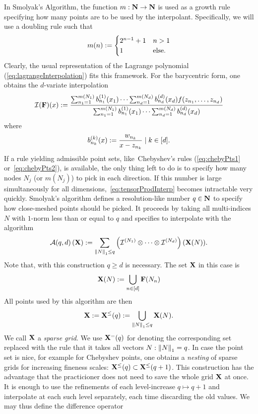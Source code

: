 \documentclass[12pt, oneside]{amsart}
\theoremstyle{definition}
\theoremstyle{remark}
\numberwithin{equation}{section}
\begin{document}
In Smolyak's Algorithm, the function \(m: \N \to \N\) is used as a growth rule specifying how many points are to be used by the interpolant. Specifically, we will use a doubling rule such that \[
    m(n) \defn \begin{cases}
        2^{n-1}+1 &n > 1\\
        1 &\text{else}.
    \end{cases}
\]
Clearly, the usual representation of the Lagrange polynomial (\ref{eq:lagrangeInterpolation}) fits this framework. For the barycentric form, one obtains the \(d\)-variate interpolation
\begin{equation}\label{eq:multivarBarycentric}
    \cI(\FF)(x) \defn \frac{\sum_{n_1=1}^{m(N_1)} b^{(1)}_{n_1}(x_1) \cdots \sum_{n_d=1}^{m(N_d)}b^{(d)}_{n_d}(x_d) f(z_{n_1}, \dots, z_{n_d})}{\sum_{n_1=1}^{m(N_1)} b^{(1)}_{n_1}(x_1) \cdots \sum_{n_d=1}^{m(N_d)}b^{(d)}_{n_d}(x_d)}
\end{equation}
where
\begin{equation}\label{eq:barycentricBasis}
    b^{(k)}_{n_k}(x) \defn \frac{w_{n_k}}{x-z_{n_k}} \mid k \in [d].
\end{equation}
If a rule yielding admissible point sets, like\ Chebyshev's rules (\ref{eq:chebyPts1} or\ \ref{eq:chebyPts2}), is available, the only thing left to do is to specify how many nodes \(N_j\) (or \(m(N_j)\)) to pick in each direction. If this number is large simultaneously for all dimensions,\ \cref{eq:tensorProdInterp} becomes intractable very quickly. Smolyak's algorithm defines a resolution-like number \(q \in \N\) to specify how close-meshed points should be picked. It proceeds by taking all multi-indices \(N\) with \(1\)-norm less than or equal to \(q\) and specifies to interpolate with the algorithm
\begin{equation}\label{eq:smolyak}
    \cA(q, d)\left(\XX\right) \defn \sum_{\norm[1]{N} \leq q} \left(\cI^{(N_1)} \otimes \cdots \otimes \cI^{(N_d)}\right)(\XX(N)).
\end{equation}
Note that, with this construction \(q \geq d\) is necessary. The set \(\XX\) in this case is
\begin{equation}\label{eq:indexGrid}
    \XX(N) \defn \bigcup_{n \in [d]} \FF(N_n)
\end{equation}
All points used by this algorithm are then
\begin{equation}\label{eq:sparseGrid}
    \XX \defn \XX^\leq(q) \defn \bigcup_{\norm[1]{N} \leq q} \XX(N).
\end{equation}
We call \(\XX\) a \emph{sparse grid}. We use \(\XX^=(q)\) for denoting the corresponding set replaced with the rule that it takes all vectors \(N: \norm[1]{N} = q\). In case the point set is nice, for example for Chebyshev points, one obtains a \emph{nesting} of sparse grids for increasing fineness scales: \(\XX^\leq(q) \subset \XX^\leq(q+1)\). This construction has the advantage that the practicioner does not need to save the whole grid \(\XX\) at once. It is enough to use the refinements of each level-increase \(q \mapsto q+1\) and interpolate at each such level separately, each time discarding the old values. We may thus define the difference operator
\end{document}
